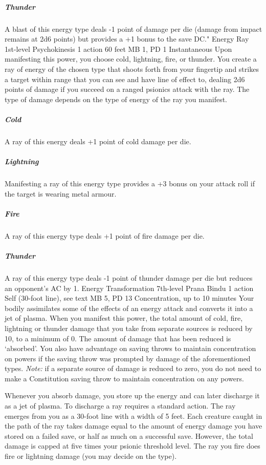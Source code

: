 \subparagraph{Thunder}
A blast of this energy
type deals -1 point of damage per die
(damage from impact
remains at 2d6 points)
but provides a +1 bonus to the save DC."
\DndPowerHeader%
    {Energy Ray\label{pwr:energy_ray}}
    {1st-level Psychokinesis}
    {1 action}
    {60 feet}
    {MB 1, PD 1}
    {Instantaneous}
Upon manifesting this power,
you choose cold, lightning, fire, or thunder.
You create a ray of energy of the chosen type that
shoots forth from your fingertip and strikes a target within range
that you can see and have line of effect to,
dealing 2d6 points of damage if you succeed on a
ranged psionics attack with the ray.
The type of damage depends on
the type of energy of the ray you manifest. 
\subparagraph{Cold}
  A ray of this energy deals +1 point of cold damage per die.
\subparagraph{Lightning}
  Manifesting a ray of this energy type provides a
  +3 bonus on your attack roll if the target is wearing metal armour.
\subparagraph{Fire}
  A ray of this energy type deals +1 point of fire damage per die.
\subparagraph{Thunder}
  A ray of this energy type deals -1 point of thunder damage per die
  but reduces an opponent's AC by 1.
\DndPowerHeader%
    {Energy Transformation\label{pwr:energy_transformation}}
    {7th-level Prana Bindu}
    {1 action}
    {Self (30-foot line), see text}
    {MB 5, PD 13}
    {Concentration, up to 10 minutes}
Your bodily assimilates some of the effects
of an energy attack and converts it into a jet of plasma.
When you manifest this power, the total amount of cold, fire,
lightning or thunder damage that you take from separate sources
is reduced by 10, to a minimum of 0. The amount of damage
that has been reduced is `absorbed'. You also have advantage
on saving throws to maintain concentration on powers if the
saving throw was prompted by damage of the aforementioned
types. \emph{Note:} if a separate source of damage is reduced
to zero, you do not need to make a Constitution saving throw
to maintain concentration on any powers.

Whenever you absorb damage, you store up the energy and can
later discharge it as a jet of plasma. To discharge a ray
requires a standard action. The ray emerges from you as a
30-foot line with a width of 5 feet. Each creature caught
in the path of the ray takes damage equal to the amount of
energy damage you have stored on a failed save, or half as
much on a successful save. However, the total damage is capped
at five times your psionic threshold level. The ray you fire
does fire or lightning damage (you may decide on the type).

